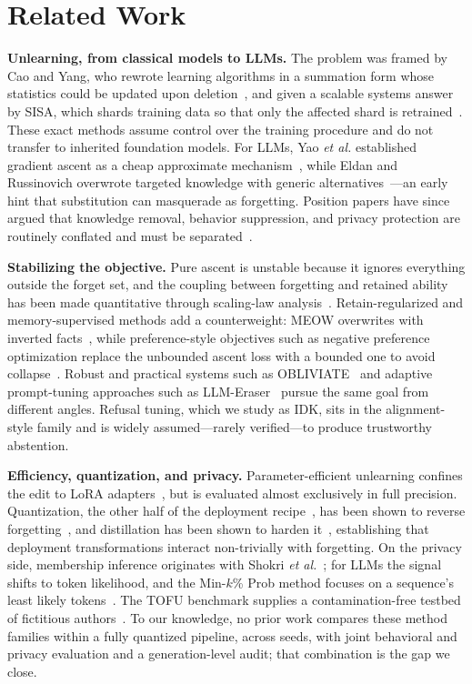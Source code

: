 \documentclass[journal]{IEEEtran}
\begin{document}
\section{Related Work}
\label{sec:related}

\textbf{Unlearning, from classical models to LLMs.} The problem was framed by Cao and Yang, who rewrote learning algorithms in a summation form whose statistics could be updated upon deletion~\cite{cao2015unlearning}, and given a scalable systems answer by SISA, which shards training data so that only the affected shard is retrained~\cite{bourtoule2021machine}. These exact methods assume control over the training procedure and do not transfer to inherited foundation models. For LLMs, Yao \emph{et al.} established gradient ascent as a cheap approximate mechanism~\cite{yao2023unlearning}, while Eldan and Russinovich overwrote targeted knowledge with generic alternatives~\cite{eldan2023harrypotter}---an early hint that substitution can masquerade as forgetting. Position papers have since argued that knowledge removal, behavior suppression, and privacy protection are routinely conflated and must be separated~\cite{liu2024rethinking,koundinya2024unlearning}.

\textbf{Stabilizing the objective.} Pure ascent is unstable because it ignores everything outside the forget set, and the coupling between forgetting and retained ability has been made quantitative through scaling-law analysis~\cite{kalajdzievski2024scaling}. Retain-regularized and memory-supervised methods add a counterweight: MEOW overwrites with inverted facts~\cite{gu2024meow}, while preference-style objectives such as negative preference optimization replace the unbounded ascent loss with a bounded one to avoid collapse~\cite{zhang2024npo,rafailov2023dpo}. Robust and practical systems such as OBLIVIATE~\cite{xu2025obliviate} and adaptive prompt-tuning approaches such as LLM-Eraser~\cite{xu2024llmeraser} pursue the same goal from different angles. Refusal tuning, which we study as IDK, sits in the alignment-style family and is widely assumed---rarely verified---to produce trustworthy abstention.

\textbf{Efficiency, quantization, and privacy.} Parameter-efficient unlearning confines the edit to LoRA adapters~\cite{hu2022lora,ding2024peft}, but is evaluated almost exclusively in full precision. Quantization, the other half of the deployment recipe~\cite{dettmers2022int8,dettmers2023qlora}, has been shown to reverse forgetting~\cite{zhang2024quantization}, and distillation has been shown to harden it~\cite{lee2025distillation}, establishing that deployment transformations interact non-trivially with forgetting. On the privacy side, membership inference originates with Shokri \emph{et al.}~\cite{shokri2017mia}; for LLMs the signal shifts to token likelihood, and the Min-$k$\% Prob method focuses on a sequence's least likely tokens~\cite{shi2024minkprob}. The TOFU benchmark supplies a contamination-free testbed of fictitious authors~\cite{maini2024tofu}. To our knowledge, no prior work compares these method families within a fully quantized pipeline, across seeds, with joint behavioral and privacy evaluation and a generation-level audit; that combination is the gap we close.
\end{document}
